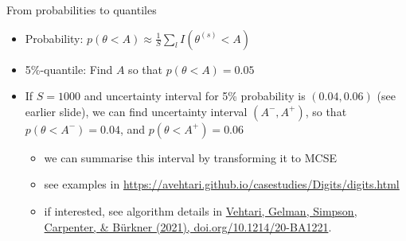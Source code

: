 \documentclass[english,t]{beamer}
\begin{document}
\begin{frame}{From probabilities to quantiles}

  \begin{itemize}
  \item Probability: $p(\theta < A)\approx \frac{1}{S}\sum_l I(\theta^{(s)} < A)$
  \item 5\%-quantile: Find $A$ so that $p(\theta < A)=0.05$
  \item<2-> If $S=1000$ and uncertainty interval for 5\% probability
    is $(0.04,0.06)$ (see earlier slide), we can find uncertainty
    interval $(A^-,A^+)$, so that $p(\theta < A^-)=0.04$, and
    $p(\theta < A^+)=0.06$
    \begin{itemize}
    \item<3-> we can summarise this interval by transforming it to MCSE
    \item<3-> see examples in \url{https://avehtari.github.io/casestudies/Digits/digits.html}
    \item<3-> {\color{gray}if interested, see algorithm details in \href{https://doi.org/10.1214/20-BA1221}{Vehtari, Gelman, Simpson, Carpenter, \& Bürkner (2021), doi.org/10.1214/20-BA1221}.}
    \end{itemize}
  \end{itemize}
  
\end{frame}
\end{document}

